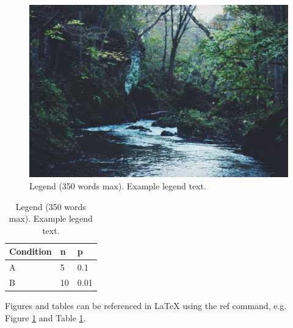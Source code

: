 \documentclass[fleqn,10pt]{wlscirep}
\begin{document}
\begin{figure}[ht]
\centering
\includegraphics[width=\linewidth]{stream}
\caption{Legend (350 words max). Example legend text.}
\label{fig:stream}
\end{figure}

\begin{table}[ht]
\centering
\begin{tabular}{|l|l|l|}
\hline
Condition & n & p \\
\hline
A & 5 & 0.1 \\
\hline
B & 10 & 0.01 \\
\hline
\end{tabular}
\caption{\label{tab:example}Legend (350 words max). Example legend text.}
\end{table}

Figures and tables can be referenced in LaTeX using the ref command, e.g. Figure \ref{fig:stream} and Table \ref{tab:example}.
\end{document}
